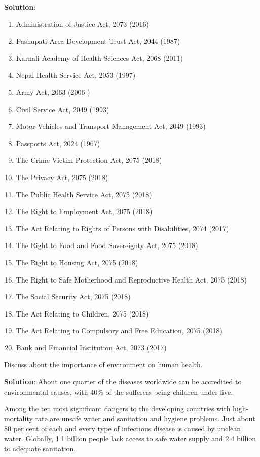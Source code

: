 \documentclass[
  openany]{book}
\newcommand{\question}{\item}
\newenvironment{solution}{ {\bfseries Solution}:}{}
\begin{document}
\begin{questions}
\begin{solution}
\begin{enumerate}
\item Administration of Justice Act, 2073 (2016)
\item Pashupati Area Development Trust Act, 2044 (1987)
\item Karnali Academy of Health Sciences Act, 2068 (2011)
\item Nepal Health Service Act, 2053 (1997)
\item Army Act, 2063 (2006 )
\item Civil Service Act, 2049 (1993)
\item Motor Vehicles and Transport Management Act, 2049 (1993)
\item Passports Act, 2024 (1967)
\item The Crime Victim Protection Act, 2075 (2018)
\item The Privacy Act, 2075 (2018)
\item The Public Health Service Act, 2075 (2018)
\item The Right to Employment Act, 2075 (2018)
\item The Act Relating to Rights of Persons with Disabilities, 2074 (2017)
\item The Right to Food and Food Sovereignty Act, 2075 (2018)
\item The Right to Housing Act, 2075 (2018)
\item The Right to Safe Motherhood and Reproductive Health Act, 2075 (2018)
\item The Social Security Act, 2075 (2018)
\item The Act Relating to Children, 2075 (2018)
\item The Act Relating to Compulsory and Free Education, 2075 (2018)
\item Bank and Financial Institution Act, 2073 (2017)
\end{enumerate}
\end{solution}

\question Discuss about the importance of environment on human health.

\begin{solution}
About one quarter of the diseases worldwide can be accredited to environmental causes, with 40\% of the sufferers being children under five.

Among the ten most significant dangers to the developing countries with high-mortality rate are unsafe water and sanitation and hygiene problems. Just about 80 per cent of each and every type of infectious disease is caused by unclean water. Globally, 1.1 billion people lack access to safe water supply and 2.4 billion to adequate sanitation.


\end{solution}
\end{questions}
\end{document}
